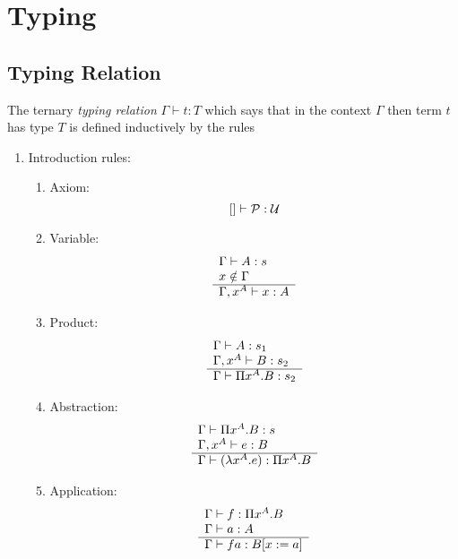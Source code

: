 \section{Typing}




\subsection{Typing Relation}

\begin{definition}
The ternary \emph{typing relation} $\Gamma \vdash t: T$ which says that in
the context $\Gamma$ then term $t$ has type $T$ is defined inductively by
the rules
\begin{enumerate}
    \item Introduction rules:
    \begin{enumerate}
        \item Axiom:
            $$
            [] \vdash {\cal P} : {\cal U}
            $$

        \item Variable:
            $$
            \begin{array}{l} 
                \Gamma \vdash A: s
                \\
                x \notin \Gamma
             \\ \hline 
                \Gamma, x^A \vdash x: A
            \end{array}
            $$

        \item Product:
            $$
            \begin{array}{l} 
                \Gamma \vdash A: s_1
                \\
                \Gamma, x^A \vdash B: s_2
             \\ \hline 
                \Gamma \vdash \Pi x^A.B : s_2
            \end{array}
            $$

        \item Abstraction:
            $$
            \begin{array}{l} 
                \Gamma \vdash \Pi x^A. B: s
                \\
                \Gamma, x^A \vdash e: B
             \\ \hline 
                \Gamma \vdash (\lambda x^A. e): \Pi x^A. B
            \end{array}
            $$

        \item Application:
            $$
            \begin{array}{l} 
                \Gamma \vdash f: \Pi x^A. B
                \\
                \Gamma \vdash a: A
             \\ \hline 
                \Gamma \vdash f a: B[x:=a]
            \end{array}
            $$
    \end{enumerate}



\end{enumerate}
\end{definition}
